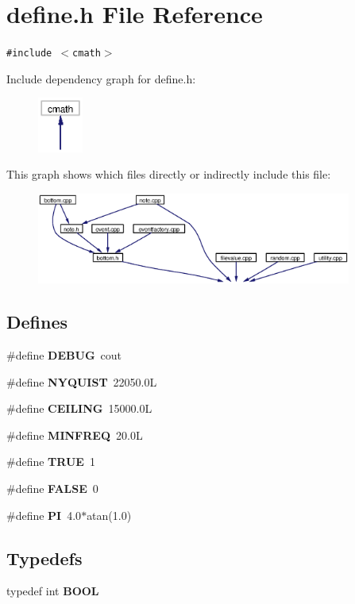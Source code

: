 \section{define.h File Reference}
\label{define_8h}
{\tt \#include $<$cmath$>$}\par


Include dependency graph for define.h:\begin{figure}[H]
\begin{center}
\leavevmode
\includegraphics[width=42pt]{define_8h__incl}
\end{center}
\end{figure}


This graph shows which files directly or indirectly include this file:\begin{figure}[H]
\begin{center}
\leavevmode
\includegraphics[width=293pt]{define_8h__dep__incl}
\end{center}
\end{figure}
\subsection*{Defines}
\begin{CompactItemize}
\item 
\#define {\bf DEBUG}\ cout
\item 
\#define {\bf NYQUIST}\ 22050.0L
\item 
\#define {\bf CEILING}\ 15000.0L
\item 
\#define {\bf MINFREQ}\ 20.0L
\item 
\#define {\bf TRUE}\ 1
\item 
\#define {\bf FALSE}\ 0
\item 
\#define {\bf PI}\ 4.0$\ast$atan(1.0)
\end{CompactItemize}
\subsection*{Typedefs}
\begin{CompactItemize}
\item 
typedef int {\bf BOOL}
\end{CompactItemize}
